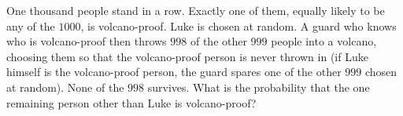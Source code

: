 One thousand people stand in a row. Exactly one of them, equally likely to be any of the $1000$, is volcano-proof. Luke is chosen at random. A guard who knows who is volcano-proof then throws $998$ of the other $999$ people into a volcano, choosing them so that the volcano-proof person is never thrown in (if Luke himself is the volcano-proof person, the guard spares one of the other $999$ chosen at random). None of the $998$ survives. What is the probability that the one remaining person other than Luke is volcano-proof?
